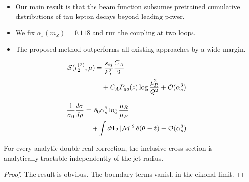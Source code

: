 \begin{itemize}
  \item Our main result is that the beam function subsumes pretrained cumulative distributions of tau lepton decays beyond leading power.
  \item We fix $\alpha_s(m_Z) = 0.118$ and run the coupling at two loops.
  \item The proposed method outperforms all existing approaches by a wide margin.
\end{itemize}

\begin{align}
  \mathcal{S}(e_2^{(2)}, \mu) &= \frac{s_{ij}}{k_T^2} \frac{C_A}{2} \nonumber \\
  &\quad + C_A P_{qq}(z) \log\frac{\mu_R^2}{Q^2} + \mathcal{O}(\alpha_s^3) \label{eq:4}
\end{align}

\begin{align}
  \frac{1}{\sigma_0} \frac{d\sigma}{d\rho} &= \beta_0 \alpha_s^2 \log\frac{\mu_R}{\mu_F} \nonumber \\
  &\quad + \int d\Phi_{2} \, |\mathcal{M}|^2 \, \delta(\theta - \hat{z}) + \mathcal{O}(\alpha_s^3) \label{eq:6}
\end{align}

\begin{proposition}[Resummation]\label{thm:2}
For every analytic double-real correction, the inclusive cross section
is analytically tractable independently of the jet radius.
\end{proposition}

\begin{proof}
The result is obvious. The boundary terms vanish in the eikonal limit.
\end{proof}

